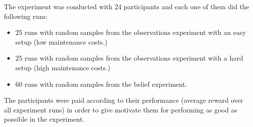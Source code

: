 The experiment was conducted with 24 participants and each one of them did the following runs:
\begin{itemize}
    \item 25 runs with random samples from the observations experiment with an easy setup (low maintenance costs.)
    \item 25 runs with random samples from the observations experiment with a hard setup (high maintenance costs.)
    \item 60 runs with random samples from the belief experiment.
\end{itemize}

The participants were paid according to their performance (average reward over all experiment runs) in order to give motivate them for performing as good as possible in the experiment.